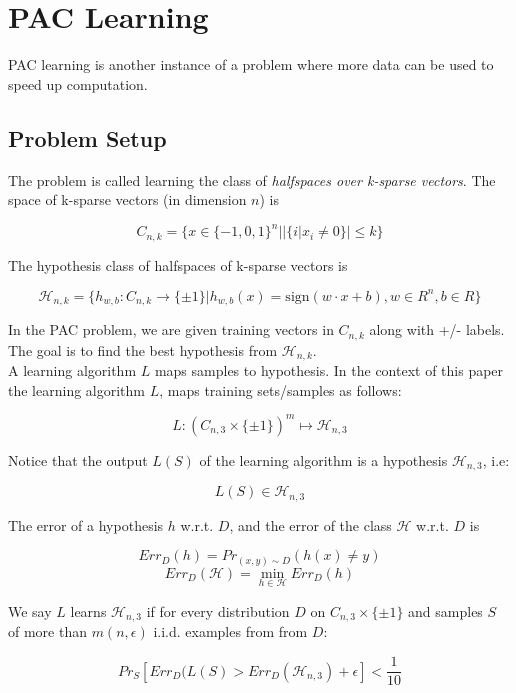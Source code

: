 \documentclass[11pt,a4paper]{article}
\begin{document}

\section{PAC Learning}

PAC learning is another instance of a problem where more data can be used to speed up computation.

\subsection{Problem Setup}

The problem is called learning the class of \textit{halfspaces over k-sparse vectors}. The space of k-sparse vectors (in dimension $n$) is

$$C_{n, k} = \{x \in \{-1, 0, 1\}^n | |\{i | x_i \neq 0\}| \leq k\}$$

The hypothesis class of halfspaces of k-sparse vectors is

$$\mathcal{H}_{n, k} = \{h_{w, b} : C_{n, k} \rightarrow \{\pm1\} | h_{w, b}(x) = \textrm{sign}(w \cdot x + b), w \in R^n, b \in R\}$$

In the PAC problem, we are given training vectors in $C_{n, k}$ along with +/- labels. The goal is to find the best hypothesis from $\mathcal{H}_{n, k}$.\\

A learning algorithm $L$ maps samples to hypothesis. In the context of this paper the learning algorithm $L$, maps training sets/samples as follows:

$$L : (C_{n,3} \times \{ \pm 1 \} )^m \mapsto \mathcal{H}_{n,3}$$

Notice that the output $L(S)$ of the learning algorithm is a hypothesis $\mathcal{H}_{n,3}$, i.e:

$$L(S) \in \mathcal{H}_{n,3}$$

The error of a hypothesis $h$ w.r.t. $D$, and the error of the class $\mathcal{H}$ w.r.t. $D$ is

$$ Err_{D}(h) = Pr_{(x,y) \sim D} (h(x) \neq y)$$
$$ Err_D(\mathcal{H}) = \min_{h \in \mathcal{H}} Err_D(h)$$

We say $L$ learns $\mathcal{H}_{n,3}$ if for every distribution $D$ on $C_{n,3} \times \{ \pm 1 \}$ and samples $S$ of more than $m(n, \epsilon)$ i.i.d. examples from from $D$:

$$ Pr_{S}[ Err_D(L(S) > Err_D(\mathcal{H}_{n,3}) + \epsilon ] < \frac{1}{10}$$
\end{document}
